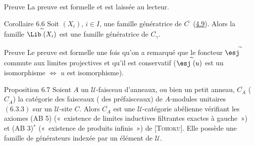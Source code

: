 \begin{enonce*}[remark]{Preuve}
La preuve est formelle et est laissée au lecteur.
\end{enonce*}

\begin{enonce*}{Corollaire 6.6}
Soit $(X_i)$, $i\in I$, une famille génératrice de
$C^{\widetilde{\phantom{,}}}$ (\hyperref[II.subsec4.9]{4.9}). Alors la famille
$\Lib^{\widetilde{\phantom{,}}}(X_i)$ est une famille
génératrice de $C^{\widetilde{\phantom{,}}}_{\gamma}$.
\end{enonce*}

\begin{enonce*}[remark]{Preuve}
Le preuve est formelle une fois qu'on a remarqué que le foncteur
$\esj^{\widetilde{\phantom{,}}}$ commute aux limites projectives et
qu'il est conservatif ($\esj^{\widetilde{\phantom{,}}}(u)$ est un
isomorphisme $\Leftrightarrow$ $u$ est isomorphisme).
\end{enonce*}

\begin{enonce*}{Proposition 6.7}
Soient $A$ un $𝒰$-faisceau d'anneaux, ou bien un petit
anneau, $C^{\widetilde{\phantom{,}}}_A$ (\resp
$C^{\widehat{\phantom{,}}}_A$) la catégorie des faisceaux (\resp
des préfaisceaux) de $A$-modules unitaires
$(\hyperref[II.subsubsec6.3.3]{6.3.3})$ sur un $𝒰$-site $C$. Alors
$C^{\widetilde{\phantom{,}}}_A$ est une $𝒰$-catégorie
abélienne vérifiant les axiomes {\rm (AB 5)} (« existence de
limites inductives filtrantes exactes à gauche ») et {\rm (AB
  3)$^{\ast}$} (« existence de produits infinis ») de
{\rm[\textsc{Tohoku}]}. Elle possède une famille de générateurs
indexée par un élément de $𝒰$.
\end{enonce*}

